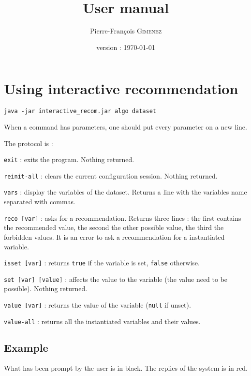 \documentclass[a4paper, 11pt]{article}
\title{User manual}
\author{Pierre-François \textsc{Gimenez}}
\date{version : \today}
\begin{document}
\maketitle

\section{Using interactive recommendation}

\texttt{java -jar interactive\_recom.jar algo dataset}

When a command has parameters, one should put every parameter on a new line.

The protocol is :

\texttt{exit} : exits the program. Nothing returned.


\texttt{reinit-all} : clears the current configuration session. Nothing returned.

\texttt{vars} : display the variables of the dataset. Returns a line with the variables name separated with commas.

\texttt{reco [var]} : asks for a recommendation. Returns three lines : the first contains the recommended value, the second the other possible value, the third the forbidden values. It is an error to ask a recommendation for a instantiated variable.

\texttt{isset [var]} : returns \texttt{true} if the variable is set, \texttt{false} otherwise.

\texttt{set [var] [value]} : affects the value to the variable (the value need to be possible). Nothing returned.

\texttt{value [var]} : returns the value of the variable (\texttt{null} if unset).

\texttt{value-all} : returns all the instantiated variables and their values.

\subsection{Example}

What has been prompt by the user is in black. The replies of the system is in red.
\end{document}

